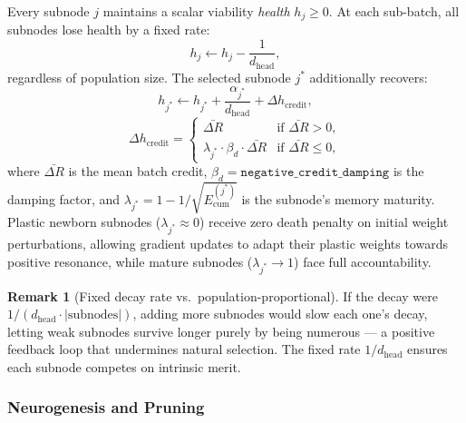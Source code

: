 \documentclass[11pt,a4paper]{article}
\theoremstyle{definition}
\newtheorem{remark}{Remark}[section]
\begin{document}
Every subnode $j$ maintains a scalar viability \emph{health} $h_j \ge 0$.
At each sub-batch, all subnodes lose health by a fixed rate:
\begin{equation}
  h_j \leftarrow h_j - \frac{1}{d_\text{head}},
  \label{eq:decay}
\end{equation}
regardless of population size.
The selected subnode $j^*$ additionally recovers:
\begin{equation}
  h_{j^*} \leftarrow h_{j^*} + \frac{\alpha_{j^*}}{d_\text{head}} + \Delta h_\text{credit},
  \label{eq:recovery}
\end{equation}
\begin{equation}
  \Delta h_\text{credit} =
  \begin{cases}
    \bar{\Delta R} & \text{if } \bar{\Delta R} > 0, \\
    \lambda_{j^*} \cdot \beta_d \cdot \bar{\Delta R} & \text{if } \bar{\Delta R} \le 0,
  \end{cases}
  \label{eq:credhealth}
\end{equation}
where $\bar{\Delta R}$ is the mean batch credit, $\beta_d = \texttt{negative\_credit\_damping}$ is the damping factor, and $\lambda_{j^*} = 1 - 1/\sqrt{E_{\text{cum}}^{(j^*)}}$ is the subnode's memory maturity. Plastic newborn subnodes ($\lambda_{j^*} \approx 0$) receive zero death penalty on initial weight perturbations, allowing gradient updates to adapt their plastic weights towards positive resonance, while mature subnodes ($\lambda_{j^*} \to 1$) face full accountability.

\begin{remark}[Fixed decay rate vs.\ population-proportional]
  If the decay were $1/(d_\text{head} \cdot |\text{subnodes}|)$, adding more subnodes would
  slow each one's decay, letting weak subnodes survive longer purely by being numerous ---
  a positive feedback loop that undermines natural selection.
  The fixed rate $1/d_\text{head}$ ensures each subnode competes on intrinsic merit.
\end{remark}

\subsubsection{Neurogenesis and Pruning}
\end{document}
